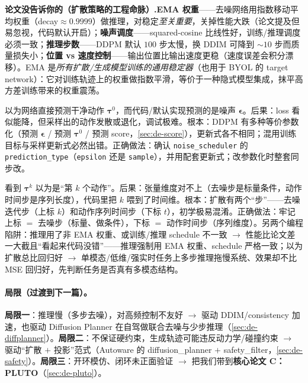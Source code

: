 \begin{note}
\textbf{论文没告诉你的（扩散策略的工程命脉）.}\;\textbf{EMA 权重}——去噪网络用指数移动平均权重（decay$\approx0.9999$）做推理，对稳定\emph{至关重要}，关掉性能大跌（论文提及但易忽视，代码默认开启）；\textbf{噪声调度}——squared-cosine 比线性好，训练/推理调度必须一致；\textbf{推理步数}——DDPM 默认 $100$ 步太慢，换 DDIM 可降到 $\sim 10$ 步而质量损失小；\textbf{位置 vs 速度控制}——输出位置比输出速度更稳（速度误差会积分漂移）。EMA 是\emph{所有扩散/生成模型训练的通用稳定器}（也用于 BYOL 的 target network）：它对训练轨迹上的权重做指数平滑，等价于一种隐式模型集成，抹平高方差训练带来的权重震荡。
\end{note}

\begin{pitfall}
以为网络直接预测干净动作 $\boldsymbol{\tau}^0$，而代码/默认实现预测的是噪声 $\boldsymbol{\epsilon}$。后果：loss 看似能降，但采样出的动作发散或退化，调试极难。根本：DDPM 有多种等价参数化（预测 $\boldsymbol{\epsilon}$ / 预测 $\boldsymbol{\tau}^0$ / 预测 score，\cref{sec:de-score}），更新式各不相同；混用训练目标与采样更新式必然出错。正确做法：确认 \texttt{noise\_scheduler} 的 \texttt{prediction\_type}（\texttt{epsilon} 还是 \texttt{sample}），并用配套更新式；改参数化时整套同步改。
\end{pitfall}

\begin{pitfall}
看到 $\boldsymbol{\tau}^k$ 以为是“第 $k$ 个动作”。后果：张量维度对不上（去噪步是标量条件，动作时间步是序列长度），代码里把 $k$ 喂到了时间维。根本：扩散有两个“步”——去噪迭代步（上标 $k$）和动作序列时间步（下标 $t$），初学极易混淆。正确做法：牢记上标 $=$ 去噪步（标量、做条件），下标 $=$ 动作时间步（序列维度）。另两个编程陷阱：推理用了非 EMA 权重、或训练/推理 schedule 不一致 $\to$ 性能比论文差一大截且“看起来代码没错”——推理强制用 EMA 权重、schedule 严格一致；以为扩散总比回归好 $\to$ 单模态/低维/强实时任务上多步推理拖慢系统、效果却不比 MSE 回归好，先判断任务是否真有多模态结构。
\end{pitfall}

\paragraph{局限（过渡到下一篇）。}
\textbf{局限一}：推理慢（多步去噪），对高频控制不友好 $\to$ 驱动 DDIM/consistency 加速，也驱动 Diffusion Planner 在自驾做联合去噪与少步推理（\cref{sec:de-diffplanner}）。\textbf{局限二}：不保证硬约束，生成轨迹可能违反动力学/碰撞约束 $\to$ 驱动“扩散 $+$ 投影”范式（Autoware 的 diffusion\_planner $+$ safety\_filter，\cref{sec:de-safety}）。\textbf{局限三}：开环模仿、闭环未正面验证 $\to$ 把我们带到\textbf{核心论文 C：PLUTO}（\cref{sec:de-pluto}）。

